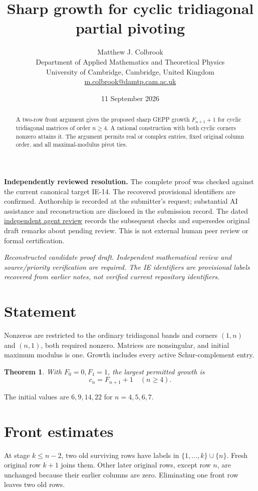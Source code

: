 \documentclass[11pt]{article}
\title{Sharp growth for cyclic tridiagonal partial pivoting}
\author{Matthew J. Colbrook\\\small Department of Applied Mathematics and Theoretical Physics\\\small University of Cambridge, Cambridge, United Kingdom\\\small\href{mailto:m.colbrook@damtp.cam.ac.uk}{m.colbrook@damtp.cam.ac.uk}}
\date{11 September 2026}
\newtheorem{theorem}{Theorem}
\begin{document}
\maketitle

\noindent\textbf{Independently reviewed resolution.} The complete proof was checked against the current canonical target IE-14. The recovered provisional identifiers are confirmed. Authorship is recorded at the submitter's request; substantial AI assistance and reconstruction are disclosed in the submission record.
The dated \href{https://github.com/MColbrook/OpenProblemsInNLA/blob/codex/colbrook-recovered-submissions/references/colbrook-recovered-2026-09-11/verification/reviews/IE-14-review.md}{independent agent review} records the subsequent checks and supersedes original draft remarks about pending review. This is not external human peer review or formal certification.
\par\medskip

\noindent\textit{Reconstructed candidate proof draft. Independent mathematical review and source/priority verification are required. The IE identifiers are provisional labels recovered from earlier notes, not verified current repository identifiers.}


\begin{abstract}
A two-row front argument gives the proposed sharp GEPP growth $F_{n+1}+1$ for cyclic tridiagonal matrices of order $n\ge4$. A rational construction with both cyclic corners nonzero attains it. The argument permits real or complex entries, fixed original column order, and all maximal-modulus pivot ties.
\end{abstract}
\section{Statement}
Nonzeros are restricted to the ordinary tridiagonal bands and corners $(1,n)$ and $(n,1)$, both required nonzero. Matrices are nonsingular, and initial maximum modulus is one. Growth includes every active Schur-complement entry.
\begin{theorem}
With $F_0=0,F_1=1$, the largest permitted growth is
\[\boxed{c_n=F_{n+1}+1\quad(n\ge4).}\]
\end{theorem}
The initial values are $6,9,14,22$ for $n=4,5,6,7$.
\section{Front estimates}
At stage $k\le n-2$, two old surviving rows have labels in $\{1,\ldots,k\}\cup\{n\}$. Fresh original row $k+1$ joins them. Other later original rows, except row $n$, are unchanged because their earlier columns are zero. Eliminating one front row leaves two old rows.
\end{document}
